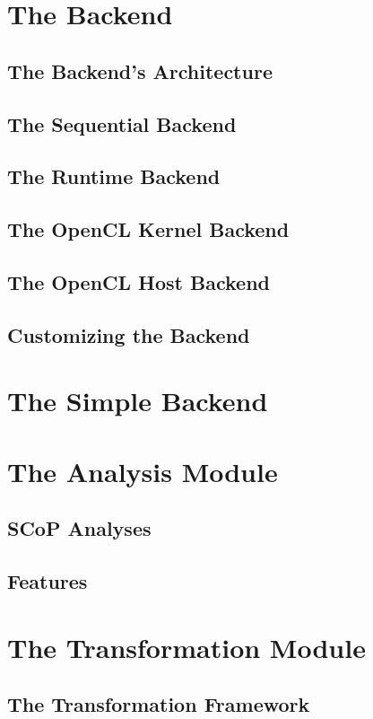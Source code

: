 \section{The Backend} \label{sec:Compiler.Backend}
\subsection{The Backend's Architecture}
\subsection{The Sequential Backend}
\subsection{The Runtime Backend}
\subsection{The OpenCL Kernel Backend}
\subsection{The OpenCL Host Backend}
\subsection{Customizing the Backend}

\section{The Simple Backend}

\section{The Analysis Module}
\subsection{SCoP Analyses}
\subsection{Features}

\section{The Transformation Module}
\subsection{The Transformation Framework}

